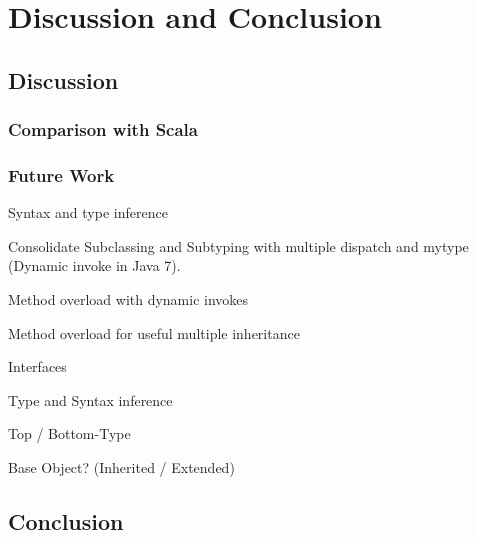 \part{Discussion and Conclusion}
\chapter{Discussion}
\label{ctr:discussion}
\section{Comparison with Scala}
\label{sec:comparisonScala}

\section{Future Work}
\label{sec:futureWork}
Syntax and type inference


Consolidate Subclassing and Subtyping with multiple dispatch and mytype (Dynamic invoke in Java 7).

Method overload with dynamic invokes

Method overload for useful multiple inheritance

Interfaces

Type and Syntax inference

Top / Bottom-Type

Base Object? (Inherited / Extended)


\chapter{Conclusion}
\label{ctr:conclusion}
